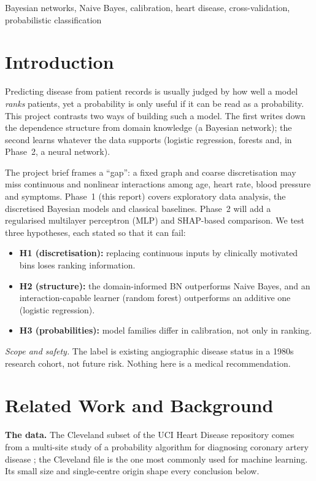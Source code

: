 \documentclass[conference]{IEEEtran}
\begin{document}
\begin{IEEEkeywords}
Bayesian networks, Naive Bayes, calibration, heart disease, cross-validation, probabilistic classification
\end{IEEEkeywords}

\section{Introduction}
Predicting disease from patient records is usually judged by how well a model \emph{ranks} patients, yet a probability is only useful if it can be read as a probability. This project contrasts two ways of building such a model. The first writes down the dependence structure from domain knowledge (a Bayesian network); the second learns whatever the data supports (logistic regression, forests and, in Phase~2, a neural network).

The project brief frames a ``gap'': a fixed graph and coarse discretisation may miss continuous and nonlinear interactions among age, heart rate, blood pressure and symptoms. Phase~1 (this report) covers exploratory data analysis, the discretised Bayesian models and classical baselines. Phase~2 will add a regularised multilayer perceptron (MLP) and SHAP-based comparison. We test three hypotheses, each stated so that it can fail:
\begin{itemize}
\item \textbf{H1 (discretisation):} replacing continuous inputs by clinically motivated bins loses ranking information.
\item \textbf{H2 (structure):} the domain-informed BN outperforms Naive Bayes, and an interaction-capable learner (random forest) outperforms an additive one (logistic regression).
\item \textbf{H3 (probabilities):} model families differ in calibration, not only in ranking.
\end{itemize}
\emph{Scope and safety.} The label is existing angiographic disease status in a 1980s research cohort, not future risk. Nothing here is a medical recommendation.

\section{Related Work and Background}
\textbf{The data.} The Cleveland subset of the UCI Heart Disease repository \cite{janosi1989uci} comes from a multi-site study of a probability algorithm for diagnosing coronary artery disease \cite{detrano1989}; the Cleveland file is the one most commonly used for machine learning. Its small size and single-centre origin shape every conclusion below.
\end{document}
